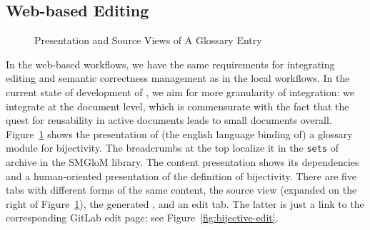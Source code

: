 \subsection{Web-based \sys Editing}\label{sec:web}

\begin{figure}[ht]\centering
  \quad
  \caption{Presentation and Source Views of A Glossary Entry}\label{fig:bijective}
\end{figure}

In the web-based workflows, we have the same requirements for integrating editing and
semantic correctness management as in the local workflows. In the current state of
development of \sys, we aim for more granularity of integration: we integrate at the
document level, which is commensurate with the fact that the quest for reusability in
active documents leads to small documents overall. Figure~\ref{fig:bijective} shows the
presentation of (the english language binding of) a glossary module for bijectivity. The
breadcrumbs at the top localize it in the \texttt{sets} of archive in the \textsf{SMGloM}
library. The content presentation shows its dependencies and a human-oriented presentation
of the definition of bijectivity. There are five tabs with different forms of the same
content, the source view (expanded on the right of Figure~\ref{fig:bijective}), the
generated \omdoc, and an edit tab. The latter is just a link to the corresponding
GitLab edit page; see Figure~\ref{fig:bijective-edit}.

